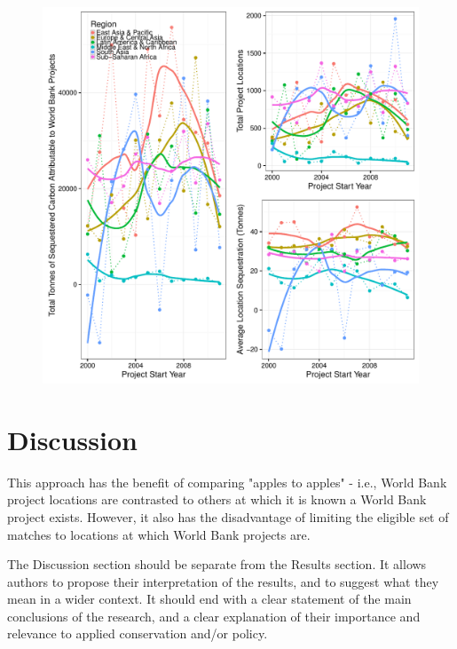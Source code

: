 \documentclass{article}\usepackage[]{graphicx}\usepackage[]{color}
\makeatletter
\def\maxwidth{ %
  \ifdim\Gin@nat@width>\linewidth
    \linewidth
  \else
    \Gin@nat@width
  \fi
}
\newenvironment{knitrout}{}{}  %
\makeatother
\begin{document}
\begin{knitrout}
\begin{figure}\centering
\begin{Schunk}

\includegraphics[width=\maxwidth]{figure/Fig1-1} \end{Schunk}
\end{figure}  

\section{Discussion}
This approach has the benefit of comparing "apples to apples" - i.e., World Bank project locations are contrasted to others at which it is known a World Bank project exists.
However, it also has the disadvantage of limiting the eligible set of matches to locations at which World Bank projects are.

The Discussion section should be separate from the Results section. It allows authors to propose their interpretation of the results, and to suggest what they mean in a wider context. It should end with a clear statement of the main conclusions of the research, and a clear explanation of their importance and relevance to applied conservation and/or policy.


\end{knitrout}
\end{document}
